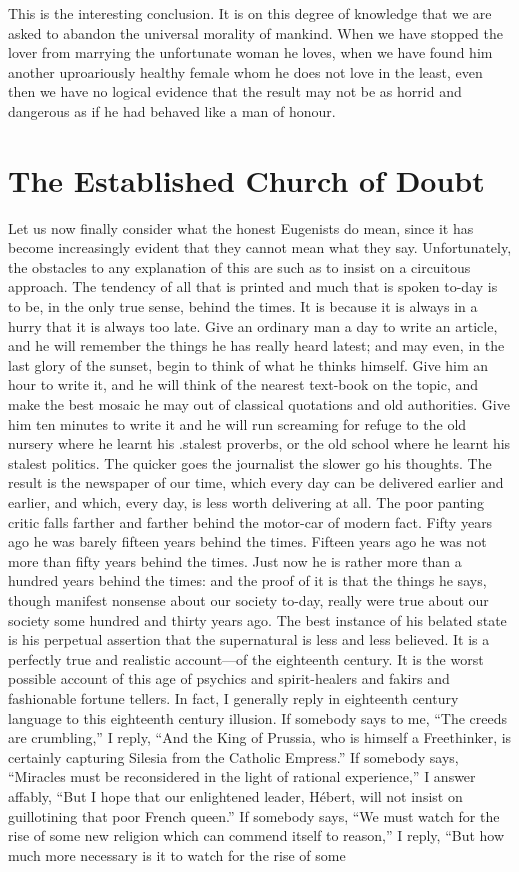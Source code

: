 \documentclass{book}
\begin{document}
This is the interesting conclusion. It is on this degree of knowledge that we are asked to abandon the universal morality of mankind. When we have stopped the lover from marrying the unfortunate woman he loves, when we have found him another uproariously healthy female whom he does not love in the least, even then we have no logical evidence that the result may not be as horrid and dangerous as if he had behaved like a man of honour.

\chapter{The Established Church of Doubt}
\label{chapter-8}
Let us now finally consider what the honest Eugenists do mean, since it has become increasingly evident that they cannot mean what they say. Unfortunately, the obstacles to any explanation of this are such as to insist on a circuitous approach. The tendency of all that is printed and much that is spoken to-day is to be, in the only true sense, behind the times. It is because it is always in a hurry that it is always too late. Give an ordinary man a day to write an article, and he will remember the things he has really heard latest; and may even, in the last glory of the sunset, begin to think of what he thinks himself. Give him an hour to write it, and he will think of the nearest text-book on the topic, and make the best mosaic he may out of classical quotations and old authorities. Give him ten minutes to write it and he will run screaming for refuge to the old nursery where he learnt his .stalest proverbs, or the old school where he learnt his stalest politics. The quicker goes the journalist the slower go his thoughts. The result is the newspaper of our time, which every day can be delivered earlier and earlier, and which, every day, is less worth delivering at all. The poor panting critic falls farther and farther behind the motor-car of modern fact. Fifty years ago he was barely fifteen years behind the times. Fifteen years ago he was not more than fifty years behind the times. Just now he is rather more than a hundred years behind the times: and the proof of it is that the things he says, though manifest nonsense about our society to-day, really were true about our society some hundred and thirty years ago. The best instance of his belated state is his perpetual assertion that the supernatural is less and less believed. It is a perfectly true and realistic account—of the eighteenth century. It is the worst possible account of this age of psychics and spirit-healers and fakirs and fashionable fortune tellers. In fact, I generally reply in eighteenth century language to this eighteenth century illusion. If somebody says to me, “The creeds are crumbling,” I reply, “And the King of Prussia, who is himself a Freethinker, is certainly capturing Silesia from the Catholic Empress.” If somebody says, “Miracles must be reconsidered in the light of rational experience,” I answer affably, “But I hope that our enlightened leader, Hébert, will not insist on guillotining that poor French queen.” If somebody says, “We must watch for the rise of some new religion which can commend itself to reason,” I reply, “But how much more necessary is it to watch for the rise of some 
\end{document}
